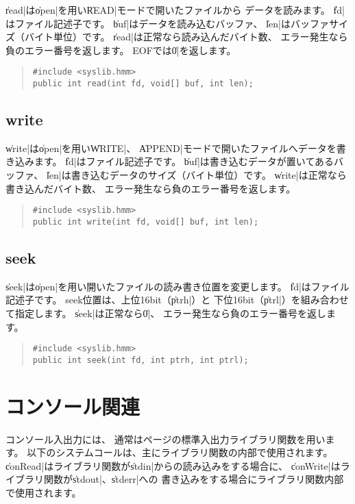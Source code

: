\|read|は\|open|を用い\|READ|モードで開いたファイルから
データを読みます。
\|fd|はファイル記述子です。
\|buf|はデータを読み込むバッファ、
\|len|はバッファサイズ（バイト単位）です。
\|read|は正常なら読み込んだバイト数、
エラー発生なら負のエラー番号を返します。
EOFでは\|0|を返します。

\begin{quote}
\begin{verbatim}
#include <syslib.hmm>
public int read(int fd, void[] buf, int len);
\end{verbatim}
\end{quote}

\subsection{write}

\|write|は\|open|を用い\|WRITE|、
\|APPEND|モードで開いたファイルへデータを書き込みます。
\|fd|はファイル記述子です。
\|buf|は書き込むデータが置いてあるバッファ、
\|len|は書き込むデータのサイズ（バイト単位）です。
\|write|は正常なら書き込んだバイト数、
エラー発生なら負のエラー番号を返します。

\begin{quote}
\begin{verbatim}
#include <syslib.hmm>
public int write(int fd, void[] buf, int len);
\end{verbatim}
\end{quote}

\subsection{seek}

\|seek|は\|open|を用い開いたファイルの読み書き位置を変更します。
\|fd|はファイル記述子です。
seek位置は、上位16bit（\|ptrh|）と
下位16bit（\|ptrl|）を組み合わせて指定します。
\|seek|は正常なら\|0|、
エラー発生なら負のエラー番号を返します。

\begin{quote}
\begin{verbatim}
#include <syslib.hmm>
public int seek(int fd, int ptrh, int ptrl);
\end{verbatim}
\end{quote}

\section{コンソール関連}

コンソール入出力には、
通常は\pageref{chap4:stdio}ページの標準入出力ライブラリ関数を用います。
以下のシステムコールは、主にライブラリ関数の内部で使用されます。
\|conRead|はライブラリ関数が\|stdin|からの読み込みをする場合に、
\|conWrite|はライブラリ関数が\|stdout|、\|stderr|への
書き込みをする場合にライブラリ関数内部で使用されます。

